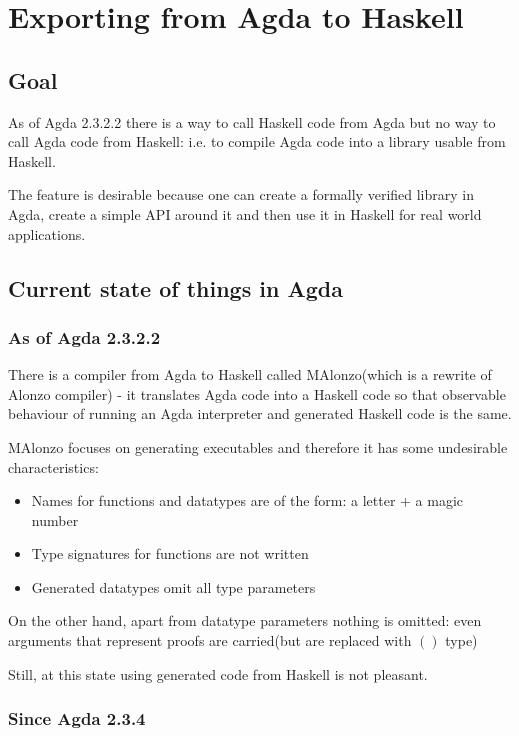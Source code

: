 \section{Exporting from Agda to Haskell}

\subsection{Goal}

As of Agda 2.3.2.2 there is a way to call Haskell code from Agda but no way to call Agda code from Haskell:
i.e. to compile Agda code into a library usable from Haskell.

The feature is desirable because one can create a formally verified library in Agda, create a simple API
around it and then use it in Haskell for real world applications.

\subsection{Current state of things in Agda}

\subsubsection{As of Agda 2.3.2.2}

There is a compiler from Agda to Haskell called MAlonzo\cite{MAlonzo}(which is
a rewrite of Alonzo\cite{Alonzo} compiler) - it translates Agda code
into a Haskell code so that observable behaviour of running an Agda interpreter and generated Haskell code is the same.

MAlonzo focuses on generating executables and therefore it has some undesirable characteristics:
\begin{itemize}
\item Names for functions and datatypes are of the form: a letter + a magic number
\item Type signatures for functions are not written
\item Generated datatypes omit all type parameters
\end{itemize}

On the other hand, apart from datatype parameters nothing is omitted:
even arguments that represent proofs are carried(but are replaced with \(()\) type)

Still, at this state using generated code from Haskell is not pleasant.

\subsubsection{Since Agda 2.3.4}

